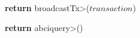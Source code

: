 \begin{figure}[t!]
  \begin{adjustbox}{minipage=[t]{\columnwidth}}
    \begin{algorithm}[H]
      \renewcommand{\thealgorithm}{API Vanilla}         
      \caption{}%
      \label{alg:api-vanilla}%
      \small
      \begin{algorithmic}[1]
            \label{alg:van_add}
                \State \textbf{return} \<broadcastTx>($transaction$)
            \EndFunction
      
            \label{alg:van_get}
                	\State \textbf{return} \<abciquery>()
            \EndFunction
            
        \end{algorithmic}
      \end{algorithm}
	\end{adjustbox}
  \end{figure}

